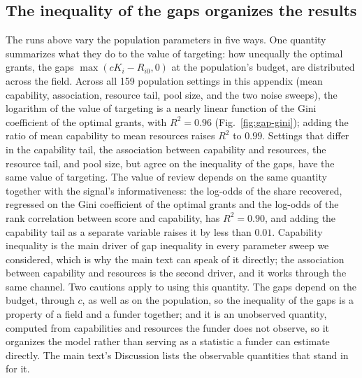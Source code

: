 

\subsection*{The inequality of the gaps organizes the results}
The runs above vary the population parameters in five ways. One quantity summarizes what they do to the value of targeting: how unequally the optimal grants, the gaps $\max(cK_i - R_{i0}, 0)$ at the population's budget, are distributed across the field. Across all 159 population settings in this appendix (mean capability, association, resource tail, pool size, and the two noise sweeps), the logarithm of the value of targeting is a nearly linear function of the Gini coefficient of the optimal grants, with $R^2 = 0.96$ (Fig.~\ref{fig:gap-gini}); adding the ratio of mean capability to mean resources raises $R^2$ to $0.99$. Settings that differ in the capability tail, the association between capability and resources, the resource tail, and pool size, but agree on the inequality of the gaps, have the same value of targeting. The value of review depends on the same quantity together with the signal's informativeness: the log-odds of the share recovered, regressed on the Gini coefficient of the optimal grants and the log-odds of the rank correlation between score and capability, has $R^2 = 0.90$, and adding the capability tail as a separate variable raises it by less than $0.01$. Capability inequality is the main driver of gap inequality in every parameter sweep we considered, which is why the main text can speak of it directly; the association between capability and resources is the second driver, and it works through the same channel. Two cautions apply to using this quantity. The gaps depend on the budget, through $c$, as well as on the population, so the inequality of the gaps is a property of a field and a funder together; and it is an unobserved quantity, computed from capabilities and resources the funder does not observe, so it organizes the model rather than serving as a statistic a funder can estimate directly. The main text's Discussion lists the observable quantities that stand in for it.


